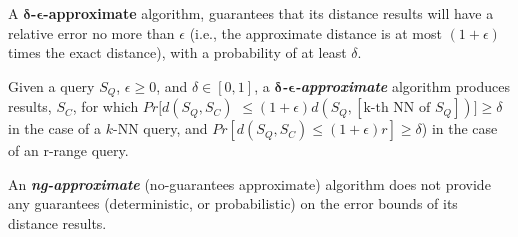 A {\bf $\bm{\delta}$-$\bm{\epsilon}$-approximate} algorithm, guarantees that its distance results will have a relative error no more than $\epsilon$ (i.e., the approximate distance is at most $(1+\epsilon)$ times the exact distance), with a probability of at least $\delta$.
	

\begin{defn} \label{def:probmatch}
Given a query $S_Q$, $\epsilon \geq 0$, and $\delta \in [0,1]$, a \textit{\textbf{$\bm{\delta}$-$\bm{\epsilon}$-approximate}} algorithm produces results, $S_C$, for which $Pr[d(S_Q,S_C)$ $\leq (1+\epsilon)d(S_Q,[\text{k-th NN of }S_Q])] \geq \delta$ in the case of a $k$-NN query, and $Pr[d(S_Q,S_C) \leq (1+\epsilon)r] \geq \delta$) in the case of an r-range query.
\end{defn}


An \textit{\textbf{ng-approximate}} (no-guarantees approximate) algorithm does not provide any guarantees (deterministic, or probabilistic) on the error bounds of its distance results.

